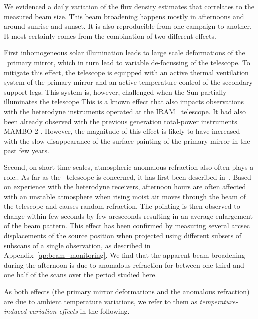 We evidenced a daily variation of the flux density estimates that correlates to the
measured beam size. This beam broadening happens mostly in afternoons and around
sunrise and sunset. It is also reproducible from one campaign to another. It most certainly
comes from the combination of two different effects.

First inhomogeneous solar illumination leads to large scale deformations of the
\trentemetre\ primary mirror, which in turn lead to variable de-focussing of the
telescope. {\lp To mitigate this effect, the telescope is equipped with an
  active thermal ventilation system of the primary mirror and an active
  temperature control of the secondary support legs. This system is, however,
  challenged when the Sun partially illuminates the telescope}
  {\lp This is a known effect that also impacts
  observations with the heterodyne instruments operated at the IRAM
  \trentemetre\ telescope. It had also been already observed with the previous
  generation total-power instruments MAMBO-2 \citep{Kreysa1999}.} However, the
magnitude of this effect is likely to have increased with the slow disappearance
of the surface painting of the primary mirror in the past few years.

Second, on short time scales, atmospheric anomalous refraction {\lp also often plays a
  role.}. As far as the \trentemetre\ telescope is concerned, it has first
been described in~\citet{Altenhoff1987}. Based on experience with
  the heterodyne receivers, afternoon hours are
  often affected with an unstable atmosphere when rising moist air moves
  through the beam of the telescope and causes random refraction. The pointing
  is then observed to change within few seconds by few arcseconds {\lp resulting in an average
    enlargement of the beam pattern.} This effect has been confirmed by
  measuring several arcsec displacements of the source position when projected using
  different subsets of subscans of a single observation, as described
  in Appendix~\ref{ap:beam_monitoring}. We find that the apparent beam broadening during
  the afternoon is due to anomalous refraction for between one third
  and one half of the scans over the period studied here.


{\lp As both effects (the primary mirror deformations and the anomalous
  refraction) are due to ambient temperature variations, we refer to them as
  \emph{temperature-induced variation effects} in the following.}\\


